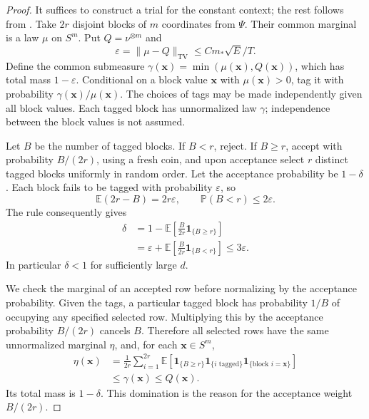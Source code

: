 \begin{proof}
It suffices to construct a trial for the constant context; the rest
follows from .  Take $2r$ disjoint
blocks of $m$ coordinates from $\Psi$.  Their common marginal is a law
$\mu$ on $S^m$.  Put $Q=\nu^{\otimes m}$ and
\[
 \varepsilon=\|\mu-Q\|_{\mathrm{TV}}
       \le C m_*\sqrt E/T.
\]
Define the common submeasure $\gamma(\boldsymbol x)
=\min(\mu(\boldsymbol x),Q(\boldsymbol x))$, which has total mass
$1-\varepsilon$.  Conditional on a block value $\boldsymbol x$ with
$\mu(\boldsymbol x)>0$, tag it with probability
$\gamma(\boldsymbol x)/\mu(\boldsymbol x)$.  The choices of tags may be
made independently given all block values.  Each tagged block has
unnormalized law $\gamma$; independence between the block values is not
assumed.

Let $B$ be the number of tagged blocks.  If $B<r$, reject.  If $B\ge r$,
accept with probability $B/(2r)$, using a fresh coin, and upon acceptance
select $r$ distinct tagged blocks uniformly in random order.  Let the
acceptance probability be $1-\delta$.  Each block fails to be tagged with
probability $\varepsilon$, so
\[
 \mathbb E(2r-B)=2r\varepsilon,
 \qquad\mathbb P(B<r)\le2\varepsilon.
\]
The rule consequently gives
\begin{equation}
\label{entropy-foundations:acceptance-error}
\begin{split}
 \delta
 &=1-\mathbb E\left[\frac B{2r}\mathbf1_{\{B\ge r\}}\right]\\
 &=\varepsilon+\mathbb E\left[\frac B{2r}\mathbf1_{\{B<r\}}\right]
 \le3\varepsilon.
\end{split}
\end{equation}
In particular $\delta<1$ for sufficiently large $d$.

We check the marginal of an accepted row before normalizing by the
acceptance probability.  Given the tags, a particular tagged block has
probability $1/B$ of occupying any specified selected row.  Multiplying
this by the acceptance probability $B/(2r)$ cancels $B$.  Therefore all
selected rows have the same unnormalized marginal $\eta$, and, for each
$\boldsymbol x\in S^m$,
\begin{equation}
\label{entropy-foundations:accepted-submeasure}
\begin{split}
 \eta(\boldsymbol x)
 &=\frac1{2r}\sum_{i=1}^{2r}
   \mathbb E\!\left[
      \mathbf1_{\{B\ge r\}}
      \mathbf1_{\{i\text{ tagged}\}}
      \mathbf1_{\{\text{block }i=\boldsymbol x\}}
                  \right]\\
 &\le\gamma(\boldsymbol x)\le Q(\boldsymbol x).
\end{split}
\end{equation}
Its total mass is $1-\delta$.  This domination is the reason for the
acceptance weight $B/(2r)$.


\end{proof}
